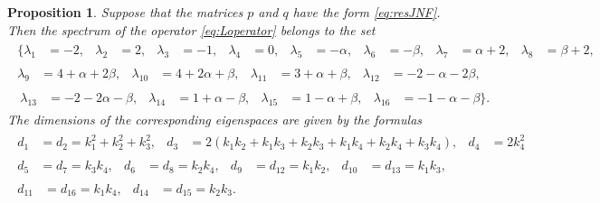 \documentclass{article}
\theoremstyle{plain}
\newtheorem{proposition}{Proposition}
\begin{document}
\begin{proposition} \label{thm:spectrumL} Suppose that the matrices  $p$ and $q$ have the form  \eqref{eq:resJNF}. Then the spectrum of the operator \eqref{eq:Loperator} belongs to the set 
\begin{gather*}
    \begin{aligned}
    \{
    \lambda_1
    &= - 2, 
    &
    \lambda_2
    &= 2,
    & 
    \lambda_3 
    &= - 1, 
    &
    \lambda_4
    &= 0, 
    &
    \lambda_5
    &= - \alpha, 
    &
    \lambda_6
    &= - \beta,
    &
    \lambda_7
    &= \alpha + 2,
    &
    \lambda_8
    &= \beta + 2,
    \end{aligned}
    \\
    \begin{aligned}
    \lambda_9
    &= 4 + \alpha + 2 \beta,
    &
    \lambda_{10}
    &= 4 + 2 \alpha + \beta,
    &
    \lambda_{11}
    &= 3 + \alpha + \beta,
    &
    \lambda_{12}
    &= - 2 - \alpha - 2 \beta,
    \end{aligned}
    \\
    \begin{aligned}\
    \lambda_{13}
    &= - 2 - 2 \alpha - \beta,
    &
    \lambda_{14}
    &= 1 + \alpha - \beta, 
    &
    \lambda_{15}
    &= 1 - \alpha + \beta, 
    &
    \lambda_{16}
    &= - 1 - \alpha - \beta
    \}.
    \end{aligned}
\end{gather*}
The dimensions of the corresponding eigenspaces are given by the formulas 
\begin{gather*}
    \begin{aligned}
    d_1
    &= d_2
    = k_1^2 + k_2^2 + k_3^2,
    & 
    d_3
    &= 2 \left(k_1 k_2 + k_1 k_3 + k_2 k_3 + k_1 k_4 + k_2 k_4 + k_3 k_4\right), 
    &
    d_4
    &= 2 k_4^2
    \end{aligned}
    \\
    \begin{aligned}
    d_5
    &= d_7
    = k_3 k_4, 
    & 
    d_6
    &= d_8
    = k_2 k_4,
    &
    d_9
    &= d_{12}
    = k_1 k_2,
    &
    d_{10}
    &= d_{13}
    = k_1 k_3,
    \end{aligned}
    \\
    \begin{aligned}
    d_{11}
    &= d_{16}
    = k_1 k_4,
    &
    d_{14}
    &= d_{15}
    = k_2 k_3.
    \end{aligned}
\end{gather*}
\end{proposition}
\end{document}
